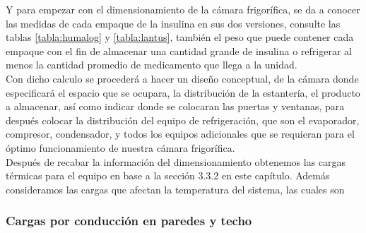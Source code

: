  Y para empezar con el dimensionamiento de la cámara frigorífica, se da a conocer 
 las medidas de cada empaque de la insulina en sus dos versiones, consulte las tablas \ref{tabla:humalog} y \ref{tabla:lantus}, también el peso que puede contener cada
 empaque con el fin de almacenar una cantidad grande de insulina o refrigerar al menos la cantidad promedio de medicamento que llega a la unidad.\\
 Con dicho calculo se procederá a hacer un diseño conceptual, de la cámara donde
 especificará el espacio que se ocupara, la distribución de la estantería, el producto
 a almacenar, así como indicar donde se colocaran las puertas y ventanas, para
 después colocar la distribución del equipo de refrigeración, que son el evaporador,
 compresor, condensador, y todos los equipos adicionales que se requieran para el
 óptimo funcionamiento de nuestra cámara frigorífica.\\
 Después de recabar la información del dimensionamiento obtenemos las cargas térmicas para el equipo en base a la sección 3.3.2 en este capítulo. Además consideramos las cargas que afectan la temperatura del sistema, las cuales son
 
 \subsubsection{Cargas por conducción en paredes y techo}
 
